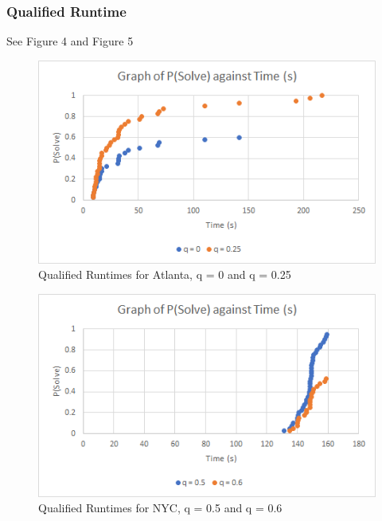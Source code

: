 \documentclass[sigconf]{acmart}
\begin{document}
\subsubsection{Qualified Runtime}
See Figure 4 and Figure 5
\begin{figure}[h]
  \centering
  \includegraphics[width=\linewidth=]{genetic_qrtd_Atlanta.png}
  \caption{Qualified Runtimes for Atlanta, q = 0 and q = 0.25}
\end{figure}
\begin{figure}[h]
  \centering
  \includegraphics[width=\linewidth]{genetic_qrtd_NYC.png}
  \caption{Qualified Runtimes for NYC, q = 0.5 and q = 0.6}
\end{figure}
\end{document}
